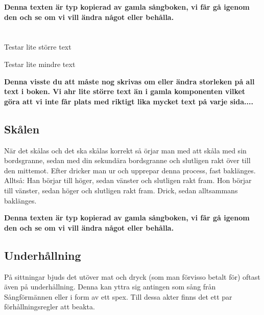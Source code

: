 \textbf{Denna texten är typ kopierad av gamla sångboken, vi får gå igenom den och se om vi vill ändra något eller behålla.}
\\
\\
\\

{\fontsize{16}{18}\selectfont Testar lite större text}

{\fontsize{5}{7}\selectfont Testar lite mindre text}


\textbf{Denna visste du att måste nog skrivas om eller ändra storleken på all text i boken. Vi ahr lite större text än i gamla komponenten vilket göra att vi inte får plats med riktigt lika mycket text på varje sida....}


\newpage

\subsection*{Skålen}

När det skålas och det ska skålas korrekt så örjar man med att skåla med sin bordsgranne, sedan med din sekundära bordsgranne och slutligen rakt över till den mittemot. Efter dricker man ur och upprepar denna process, fast baklänges.
\\

Alltså:
Han börjar till höger,
sedan vänster och slutligen rakt fram.
Hon börjar till vänster,
sedan höger och slutligen rakt fram.
Drick, sedan alltsammans baklänges.

\textbf{Denna texten är typ kopierad av gamla sångboken, vi får gå igenom den och se om vi vill ändra något eller behålla.}


\newpage

\subsection*{Underhållning}
På sittningar bjuds det utöver mat och dryck (som man förvisso betalt för) oftast även på underhållning.
Denna kan yttra sig antingen som sång från Sångförmännen eller i form av ett spex.
Till dessa akter finns det ett par förhållningsregler att beakta.
\\

